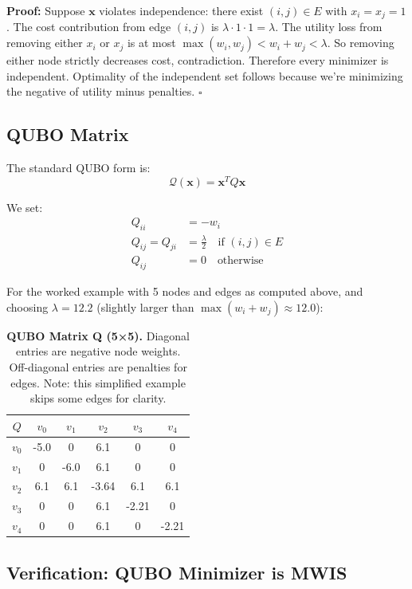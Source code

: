 \textbf{Proof:} Suppose $\mathbf{x}$ violates independence: there exist $(i, j) \in E$ with $x_i = x_j = 1$. The cost contribution from edge $(i,j)$ is $\lambda \cdot 1 \cdot 1 = \lambda$. The utility loss from removing either $x_i$ or $x_j$ is at most $\max(w_i, w_j) < w_i + w_j < \lambda$. So removing either node strictly decreases cost, contradiction. Therefore every minimizer is independent. Optimality of the independent set follows because we're minimizing the negative of utility minus penalties. \hfill $\square$

\subsection{QUBO Matrix}

The standard QUBO form is:
\[
\mathcal{Q}(\mathbf{x}) = \mathbf{x}^T Q \mathbf{x}
\]

We set:
\begin{align}
Q_{ii} &= -w_i \\
Q_{ij} = Q_{ji} &= \frac{\lambda}{2} \quad \text{if } (i,j) \in E \\
Q_{ij} &= 0 \quad \text{otherwise}
\end{align}

For the worked example with 5 nodes and edges as computed above, and choosing $\lambda = 12.2$ (slightly larger than $\max(w_i + w_j) \approx 12.0$):

\begin{table}[H]
\centering
\tiny
\begin{tabular}{c|ccccc}
\toprule
$Q$ & $v_0$ & $v_1$ & $v_2$ & $v_3$ & $v_4$ \\
\midrule
$v_0$ & -5.0 & 0 & 6.1 & 0 & 0 \\
$v_1$ & 0 & -6.0 & 6.1 & 0 & 0 \\
$v_2$ & 6.1 & 6.1 & -3.64 & 6.1 & 6.1 \\
$v_3$ & 0 & 0 & 6.1 & -2.21 & 0 \\
$v_4$ & 0 & 0 & 6.1 & 0 & -2.21 \\
\bottomrule
\end{tabular}
\caption{\textbf{QUBO Matrix Q (5×5).} Diagonal entries are negative node weights. Off-diagonal entries are penalties for edges. Note: this simplified example skips some edges for clarity.}
\label{tab:qubo-matrix}
\end{table}

\subsection{Verification: QUBO Minimizer is MWIS}

